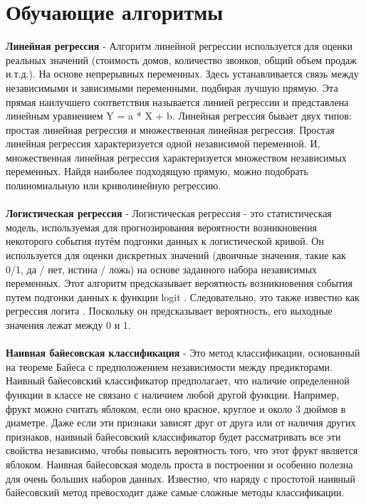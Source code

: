 \section{Обучающие алгоритмы}

\textbf{Линейная регрессия} - Алгоритм линейной регрессии используется для оценки реальных значений (стоимость домов, количество звонков, общий объем продаж и.т.д.). На основе непрерывных переменных. Здесь устанавливается связь между независимыми и зависимыми переменными, подбирая лучшую прямую. Эта прямая наилучшего соответствия называется линией регрессии и представлена линейным уравнением Y = a * X + b.
Линейная регрессия бывает двух типов: простая линейная регрессия и множественная линейная регрессия. Простая линейная регрессия характеризуется одной независимой переменной. И, множественная линейная регрессия характеризуется множеством независимых переменных. Найдя наиболее подходящую прямую, можно подобрать полиномиальную или криволинейную регрессию. \\ \\ 

\textbf{Логистическая регрессия} - Логистическая регрессия - это статистическая модель, используемая для прогнозирования вероятности возникновения некоторого события путём подгонки данных к логистической кривой. Он используется для оценки дискретных значений (двоичные значения, такие как 0/1, да / нет, истина / ложь) на основе заданного набора независимых переменных. Этот алгоритм предсказывает вероятность возникновения события путем подгонки данных к функции logit . Следовательно, это также известно как регрессия логита . Поскольку он предсказывает вероятность, его выходные значения лежат между 0 и 1. \\ \\

\textbf{Наивная байесовская классификация} - Это метод классификации, основанный на  теореме Байеса с предположением независимости между предикторами. Наивный байесовский классификатор предполагает, что наличие определенной функции в классе не связано с наличием любой другой функции. Например, фрукт можно считать яблоком, если оно красное, круглое и около 3 дюймов в диаметре. Даже если эти признаки зависят друг от друга или от наличия других признаков, наивный байесовский классификатор будет рассматривать все эти свойства независимо, чтобы повысить вероятность того, что этот фрукт является яблоком.
Наивная байесовская модель проста в построении и особенно полезна для очень больших наборов данных. Известно, что наряду с простотой наивный байесовский метод превосходит даже самые сложные методы классификации. \\ \\
